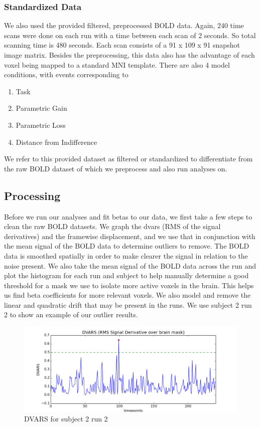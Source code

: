 \subsubsection{Standardized Data}
We also used the provided filtered, preprocessed BOLD data. Again, 240 time scans 
were done on each run with a time between each scan of 2 seconds. So total scanning 
time is 480 seconds. Each scan consists of a 91 x 109 x 91 snapshot image
matrix. Besides the preprocessing, this data also has the advantage of each 
voxel being mapped to a standard MNI template. There are also 4 model 
conditions, with events corresponding to 
\begin{enumerate}
  \item Task
  \item Parametric Gain
  \item Parametric Loss
  \item Distance from Indifference
\end{enumerate}
We refer to this provided dataset as filtered or standardized to differentiate from the raw
BOLD dataset of which we preprocess and also run analyses on.

\subsection{Processing}
Before we run our analyses and fit betas to our data, we first take a few 
steps to clean the raw BOLD datasets. We graph the dvars (RMS of the signal 
derivatives) and the framewise displacement, and we use that in conjunction 
with the mean signal of the BOLD data to determine outliers to remove. The 
BOLD data is smoothed spatially in order to make clearer the signal in 
relation to the noise present. We also take the mean signal of the BOLD data 
across the run and plot the histogram for each run and subject to help 
manually determine a good threshold for a mask we use to isolate more active 
voxels in the brain. This helps us find beta coefficients for more relevant 
voxels. We also model and remove the linear and quadratic drift that may be 
present in the runs. 
We use subject 2 run 2 to show an example of our outlier results.

\begin{figure}[H]
    \centering
        \includegraphics[scale=0.5]{figures/dvars_sub2run2.png}
    \caption{DVARS for subject 2 run 2}
\end{figure}

